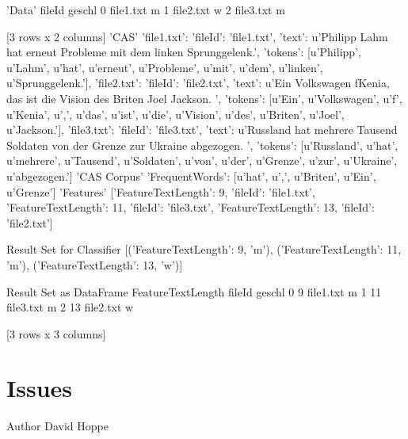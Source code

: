 \begin{DoxyCode}
 'Data'
       fileId geschl
 0  file1.txt      m
 1  file2.txt      w
 2  file3.txt      m
 
 [3 rows x 2 columns]
 'CAS'
 {'file1.txt': {'fileId': 'file1.txt',
                'text': u'Philipp Lahm hat erneut Probleme mit dem linken
       Sprunggelenk.',
                'tokens': [u'Philipp',
                           u'Lahm',
                           u'hat',
                           u'erneut',
                           u'Probleme',
                           u'mit',
                           u'dem',
                           u'linken',
                           u'Sprunggelenk.']},
  'file2.txt': {'fileId': 'file2.txt',
                'text': u'Ein Volkswagen f\xfcr Kenia, das ist die Vision des
       Briten Joel Jackson. ',
                'tokens': [u'Ein',
                           u'Volkswagen',
                           u'f\xfcr',
                           u'Kenia',
                           u',',
                           u'das',
                           u'ist',
                           u'die',
                           u'Vision',
                           u'des',
                           u'Briten',
                           u'Joel',
                           u'Jackson.']},
  'file3.txt': {'fileId': 'file3.txt',
                'text': u'Russland hat mehrere Tausend Soldaten von der Grenze
       zur Ukraine abgezogen. \n',
                'tokens': [u'Russland',
                           u'hat',
                           u'mehrere',
                           u'Tausend',
                           u'Soldaten',
                           u'von',
                           u'der',
                           u'Grenze',
                           u'zur',
                           u'Ukraine',
                           u'abgezogen.']}}
 'CAS Corpus'
 {'FrequentWords': [u'hat', u',', u'Briten', u'Ein', u'Grenze']}
 'Features'
 [{'FeatureTextLength': 9, 'fileId': 'file1.txt'},
  {'FeatureTextLength': 11, 'fileId': 'file3.txt'},
  {'FeatureTextLength': 13, 'fileId': 'file2.txt'}]
 
 Result Set for Classifier
 [({'FeatureTextLength': 9}, 'm'),
  ({'FeatureTextLength': 11}, 'm'),
  ({'FeatureTextLength': 13}, 'w')]
 
 Result Set as DataFrame
    FeatureTextLength     fileId geschl
 0                  9  file1.txt      m
 1                 11  file3.txt      m
 2                 13  file2.txt      w
 
 [3 rows x 3 columns]
\end{DoxyCode}
\hypertarget{index_Issues}{}\section{\-Issues}\label{index_Issues}
\begin{DoxyAuthor}{\-Author}
\-David \-Hoppe 
\end{DoxyAuthor}

